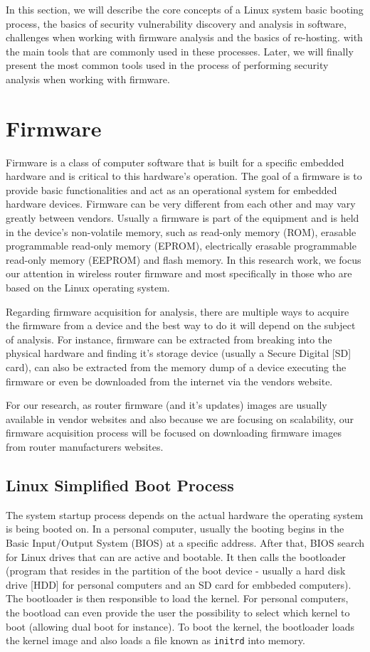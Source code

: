 In this section, we will describe the core concepts of a Linux system basic booting process, the basics of security vulnerability discovery and analysis in software, challenges when working with firmware analysis and the basics of re-hosting.  with the main tools that are commonly used in these processes. Later, we will finally present the most common tools used in the process of performing security analysis when working with firmware.

\section{Firmware}

Firmware is a class of computer software that is built for a specific embedded hardware and is critical to this hardware's operation. The goal of a firmware is to provide basic functionalities and act as an operational system for embedded hardware devices. Firmware can be very different from each other and may vary greatly between vendors. Usually a firmware is part of the equipment and is held in the device's non-volatile memory, such as read-only memory (ROM), erasable programmable read-only memory (EPROM), electrically erasable programmable read-only memory (EEPROM) and flash memory. In this research work, we focus our attention in wireless router firmware and most specifically in those who are based on the Linux operating system.

Regarding firmware acquisition for analysis, there are multiple ways to acquire the firmware from a device and the best way to do it will depend on the subject of analysis. For instance, firmware can be extracted from breaking into the physical hardware and finding it's storage device (usually a Secure Digital [SD] card), can also be extracted from the memory dump of a device executing the firmware or even be downloaded from the internet via the vendors website.

For our research, as router firmware (and it's updates) images are usually available in vendor websites and also because we are focusing on scalability, our firmware acquisition process will be focused on downloading firmware images from router manufacturers websites.

\subsection{Linux Simplified Boot Process}

The system startup process depends on the actual hardware the operating system is being booted on. In a personal computer, usually the booting begins in the Basic Input/Output System (BIOS) at a specific address. After that, BIOS search for Linux drives that can are active and bootable. It then calls the bootloader (program that resides in the partition of the boot device - usually a hard disk drive [HDD] for personal computers and an SD card for embbeded computers). The bootloader is then responsible to load the kernel. For personal computers, the bootload can even provide the user the possibility to select which kernel to boot (allowing dual boot for instance). To boot the kernel, the bootloader loads the kernel image and also loads a file known as {\tt initrd} into memory.

